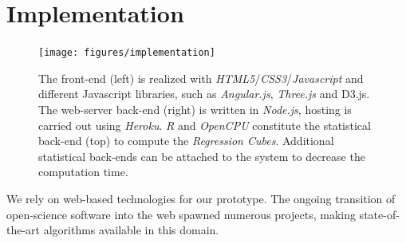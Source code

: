 \documentclass[journal]{style/vgtc} 			          %
\newcommand{\com}[1]{\textcolor{orange}{\uline{#1}}}
\begin{document}

\section{Implementation} \label{implementation}
\begin{figure}[htb]
 \centering
 \texttt{[image: figures/implementation]}
 \caption{
 The front-end (left) is realized with \emph{HTML5}/\emph{CSS3}/\emph{Javascript} and different Javascript libraries, such as \emph{Angular.js}, \emph{Three.js} and D3.js.
 The web-server back-end (right) is written in \emph{Node.js}, hosting is carried out using \emph{Heroku}.
 \emph{R} and \emph{OpenCPU} constitute the statistical back-end (top) to compute the \emph{Regression Cubes}.
 Additional statistical back-ends can be attached to the system to decrease the computation time.
 }
  \label{fig:Implementation}
\end{figure}
We rely on web-based technologies for our prototype.
The ongoing transition of open-science software into the web spawned numerous projects, making state-of-the-art algorithms available in this domain.
\end{document}
